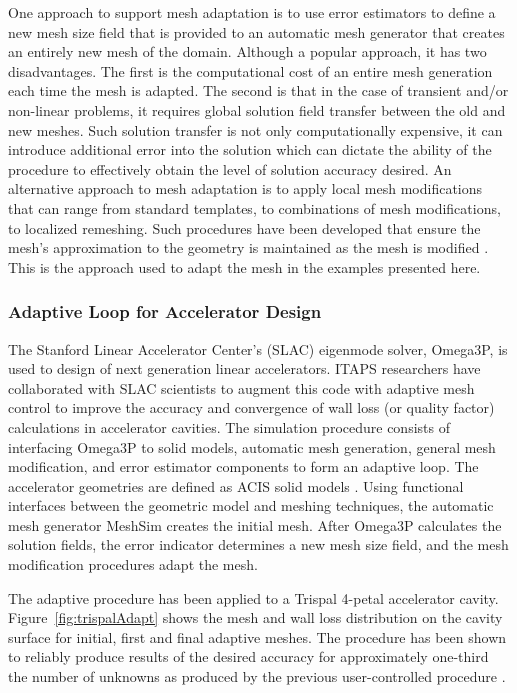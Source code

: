 One approach to support mesh adaptation is to use error estimators
to define a new mesh size field that is provided to an
automatic mesh generator that creates an entirely new mesh
of the domain. Although a popular approach, it has two
disadvantages. The first is the computational cost of an entire mesh
generation each time the mesh is adapted. The second is that in the
case of transient and/or non-linear problems, it requires global
solution field transfer between the old and new meshes. Such solution
transfer is not only computationally expensive, it can introduce
additional error into the solution which can dictate the ability of
the procedure to effectively obtain the level of solution accuracy
desired. An alternative approach to mesh adaptation is to apply local
mesh modifications \cite{LiSh05} that can range from standard templates, to
combinations of mesh modifications, to localized remeshing. Such
procedures have been developed that ensure the mesh's approximation to
the geometry is maintained as the mesh is modified \cite{LiSh03}. This is the
approach used to adapt the mesh in the examples presented here.

\subsubsection{Adaptive Loop for Accelerator Design }

The Stanford Linear Accelerator Center's (SLAC) eigenmode solver,
Omega3P, is used to design of next generation linear accelerators.
ITAPS researchers have collaborated with SLAC scientists to augment
this code with adaptive mesh control \cite{GeLe04} to improve the
accuracy and convergence of wall loss (or quality factor) calculations
in accelerator cavities. The simulation procedure consists of
interfacing Omega3P to solid models, automatic mesh generation,
general mesh modification, and error estimator components to form an
adaptive loop. The accelerator geometries are defined as ACIS solid
models \cite{spatial}. Using functional interfaces between the
geometric model and meshing techniques, the automatic mesh generator
MeshSim \cite{simmetrix} creates the initial mesh. After Omega3P
calculates the solution fields, the error indicator determines a new
mesh size field, and the mesh modification procedures \cite{LiSh05}
adapt the mesh.

The adaptive procedure has been applied to a Trispal 4-petal
accelerator cavity. Figure~\ref{fig:trispalAdapt} shows the mesh and
wall loss distribution on the cavity surface for initial, first and
final adaptive meshes. The procedure has been shown to reliably
produce results of the desired accuracy for approximately one-third
the number of unknowns as produced by the previous user-controlled
procedure \cite{GeLe04}.

